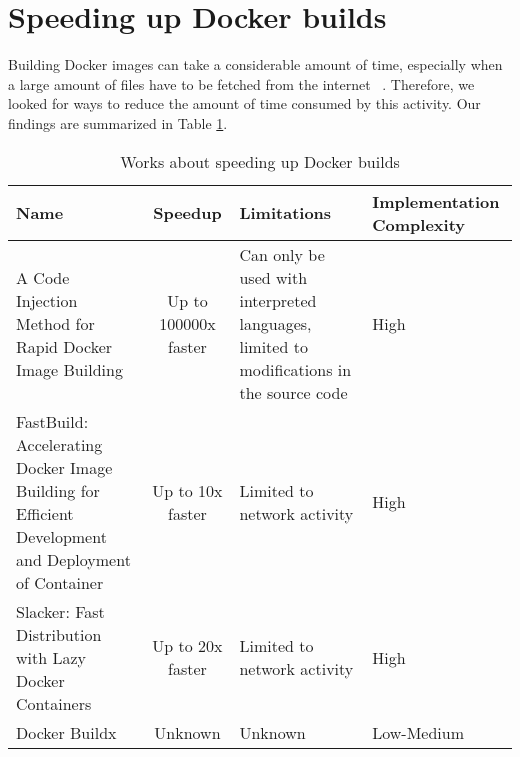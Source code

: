 
\section{Speeding up Docker builds} \label{sec:speeding_up_docker_builds}

Building Docker images can take a considerable amount of time, especially when a large amount of files have to be fetched from the internet ~\citep{harterSlackerFastDistribution}. Therefore, we looked for ways to reduce the amount of time consumed by this activity. Our findings are summarized in Table \ref{tab:works_speeding_up}.




\begin{table}[H]
    \centering
    \begin{tabular}{|p{}|c|p{}|p{}|}
        \hline \textbf{Name} & \textbf{Speedup} & \textbf{Limitations} & \textbf{Implementation Complexity} \\
        \hline A Code Injection Method for Rapid Docker Image Building \cite{wangCodeInjectionMethod2019} & Up to 100000x faster & Can only be used with interpreted languages, limited to modifications in the source code & High \\
        \hline FastBuild: Accelerating Docker Image Building for Efficient Development and Deployment of Container \cite{huangFastBuildAcceleratingDocker2019} & Up to 10x faster & Limited to network activity & High \\
        \hline Slacker: Fast Distribution with Lazy Docker Containers \cite{harterSlackerFastDistribution} & Up to 20x faster & Limited to network activity & High \\
        \hline Docker Buildx \cite{DockerBuildx2022} & Unknown & Unknown & Low-Medium \\
        \hline
    \end{tabular} 
    \caption{Works about speeding up Docker builds}
    \label{tab:works_speeding_up}
\end{table}

